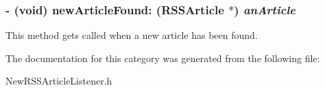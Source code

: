 \subsubsection{\setlength{\rightskip}{0pt plus 5cm}- (void) new\-Article\-Found: ({\bf RSSArticle} $\ast$) {\em an\-Article}}\label{categoryNSObject(NewRSSArticleListener)_1f93b7d179e71239abb907c5bff99983}


This method gets called when a new article has been found. 

The documentation for this category was generated from the following file:\begin{CompactItemize}
\item 
New\-RSSArticle\-Listener.h\end{CompactItemize}
